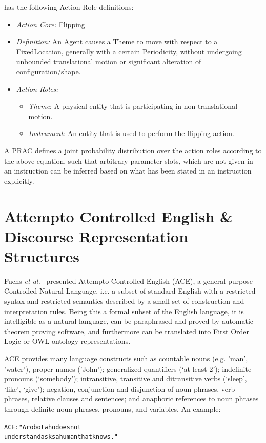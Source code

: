 \documentclass[oribibl]{llncs}
\begin{document}
has the following Action Role definitions:
\begin{itemize}
    \item \textit{Action Core:} Flipping
    \item \textit{Definition:} An Agent causes a Theme to move with respect to a FixedLocation, 
generally with a certain Periodicity, without undergoing unbounded translational 
motion or significant alteration of configuration/shape.
    \item \textit{Action Roles:}
    \begin{itemize}
        \item \textit{Theme}: A physical entity that is participating in non-translational motion.
        \item \textit{Instrument}: An entity that is used to perform the flipping action.
    \end{itemize}
\end{itemize}
A PRAC defines a joint probability distribution over the action roles
according to the above equation, such that arbitrary parameter slots, which
are not given in an instruction can be inferred based on what has been
stated in an instruction explicitly.  


\section{Attempto Controlled English \& Discourse Representation Structures}

Fuchs \textit{et al.}~\cite{fuchs:flairs2006} presented Attempto 
Controlled English (ACE), a general purpose Controlled Natural 
Language, i.e. a subset of standard English with a restricted syntax 
and restricted semantics described by a small set of construction 
and interpretation rules. Being this a formal subset of the English 
language, it is intelligible as a natural language, can be 
paraphrased and proved by automatic theorem proving software, and 
furthermore can be translated into First Order Logic or OWL ontology 
representations.

ACE provides many language constructs such as countable nouns (e.g. 
'man', 'water'), proper names ('John'); generalized quantifiers (‘at 
least 2’); indefinite pronouns (‘somebody’); intransitive, 
transitive and ditransitive verbs (‘sleep’, ‘like’, ‘give’); 
negation, conjunction and disjunction of noun phrases, verb phrases, 
relative clauses and sentences; and anaphoric references to noun 
phrases through definite noun phrases, pronouns, and variables. An 
example: \begin{alltt}{\color{red} ACE:} "A robot who does not 
understand asks a human that knows."\end{alltt}
\end{document}
